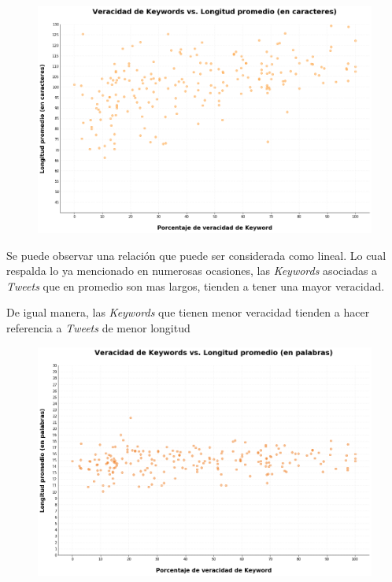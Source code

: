 \documentclass[titlepage,a4paper]{article}
\begin{document}
    \begin{figure}[H]
    \centering
    \includegraphics[width=1\textwidth]{graficos/Analisis de Keyword/veracidad_keywords_vs_long_promedio_en_caracteres.png}
    \caption{} 
    \end{figure}
    
    Se puede observar una relación que puede ser considerada como lineal. Lo cual respalda lo ya mencionado en numerosas ocasiones, las \textit{Keywords} asociadas a \textit{Tweets} que en promedio son mas largos, tienden a tener una mayor veracidad.
    
    De igual manera, las \textit{Keywords} que tienen menor veracidad tienden a hacer referencia a \textit{Tweets} de menor longitud
    
    \begin{figure}[H]
    \centering
    \includegraphics[width=1\textwidth]{graficos/Analisis de Keyword/veracidad_de_keywords_vs_long_promedio_en_palabras.png}
    \caption{} 
    \end{figure}
    
\end{document}
